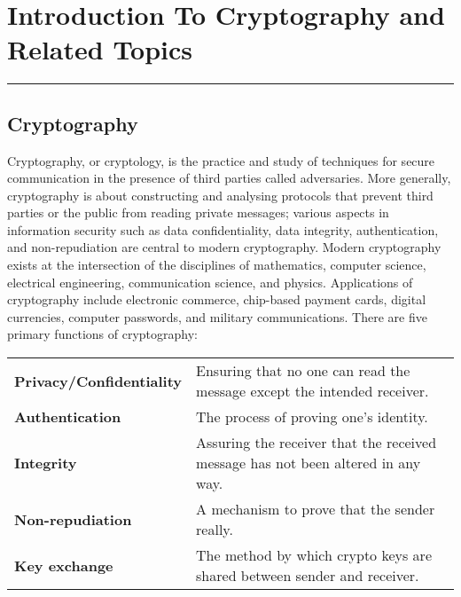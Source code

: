 \documentclass[british]{report}
\providecommand{\tabularnewline}{\\}
\begin{document}

\pagebreak{}

\setcounter{page}{1}

\chapter{Introduction To Cryptography and Related Topics}
\begin{center}
	\rule[0.5ex]{450bp}{0.75pt}
	\par\end{center}

\section{Cryptography}

Cryptography, or cryptology, is the practice and study of techniques
for secure communication in the presence of third parties called adversaries.
More generally, cryptography is about constructing and analysing protocols
that prevent third parties or the public from reading private messages;
various aspects in information security such as data confidentiality,
data integrity, authentication, and non-repudiation are central to
modern cryptography. Modern cryptography exists at the intersection
of the disciplines of mathematics, computer science, electrical engineering,
communication science, and physics. Applications of cryptography include
electronic commerce, chip-based payment cards, digital currencies,
computer passwords, and military communications. There are five primary
functions of cryptography:

\medskip{}

\begin{center}
	\begin{tabular}{|l||l|}
		\hline
		\textbf{\small{}Privacy/Confidentiality}{\small{} } & {\small{}Ensuring that no one can read the message except the intended
				receiver.}\tabularnewline
		\textbf{\small{}Authentication}{\small{} }          & {\small{}The process of proving one's identity.}\tabularnewline
		\textbf{\small{}Integrity}{\small{} }               & {\small{}Assuring the receiver that the received message has not been
				altered in any way.}\tabularnewline
		\textbf{\small{}Non-repudiation}{\small{} }         & {\small{}A mechanism to prove that the sender really.}\tabularnewline
		\textbf{\small{}Key exchange}{\small{} }            & {\small{}The method by which crypto keys are shared between sender
				and receiver.}\tabularnewline
		\hline
	\end{tabular}
	\par\end{center}
\end{document}
